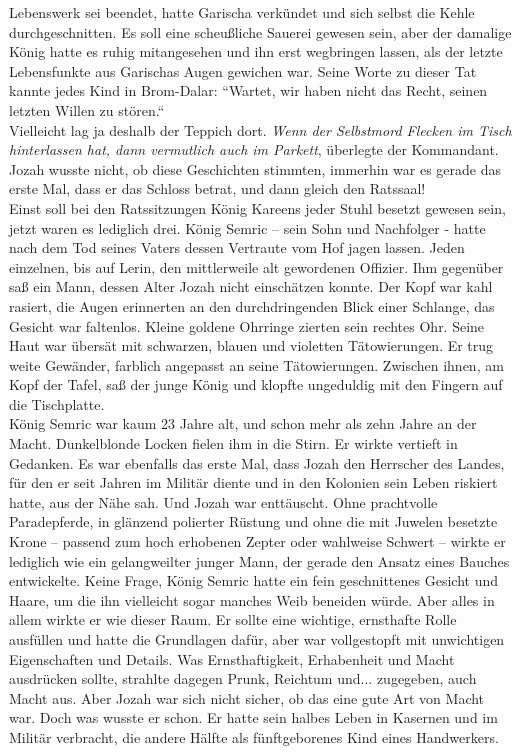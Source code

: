 Lebenswerk sei beendet, hatte Garischa verkündet und sich selbst die Kehle durchgeschnitten. Es soll 
eine scheußliche Sauerei gewesen sein, aber der damalige König hatte es ruhig mitangesehen und ihn 
erst wegbringen lassen, als der letzte Lebensfunkte aus Garischas Augen gewichen war. Seine Worte zu 
dieser Tat kannte jedes Kind in Brom-Dalar: ``Wartet, wir haben nicht das Recht, seinen letzten 
Willen zu stören.``\\ 
Vielleicht lag ja deshalb der Teppich dort. \textit{Wenn der Selbstmord Flecken im Tisch 
hinterlassen hat, dann vermutlich auch im Parkett}, überlegte der Kommandant.\\
Jozah wusste nicht, ob diese Geschichten stimmten, immerhin war es gerade das erste Mal, dass er das 
Schloss betrat, und dann gleich den Ratssaal!\\
Einst soll bei den Ratssitzungen König Kareens jeder Stuhl besetzt gewesen sein, jetzt waren es 
lediglich drei. König Semric – sein Sohn und Nachfolger - hatte nach dem Tod seines Vaters dessen 
Vertraute vom Hof jagen lassen. Jeden einzelnen, bis auf Lerin, den mittlerweile alt gewordenen 
Offizier. Ihm gegenüber saß ein Mann, dessen Alter Jozah nicht einschätzen konnte. Der Kopf war 
kahl rasiert, die Augen erinnerten an den durchdringenden Blick einer Schlange, das Gesicht war 
faltenlos. Kleine goldene Ohrringe zierten sein rechtes Ohr. Seine Haut war übersät mit schwarzen, 
blauen und violetten Tätowierungen. Er trug weite Gewänder, farblich angepasst an seine 
Tätowierungen. Zwischen ihnen, am Kopf der Tafel, saß der junge König und klopfte ungeduldig mit 
den Fingern auf die Tischplatte. \\
König Semric war kaum 23 Jahre alt, und schon mehr als zehn Jahre an der Macht. Dunkelblonde Locken 
fielen ihm in die Stirn. Er wirkte vertieft in Gedanken. Es war ebenfalls das erste Mal, dass Jozah 
den Herrscher des Landes, für den er seit Jahren im Militär diente und in den Kolonien sein Leben 
riskiert hatte, aus der Nähe sah. Und Jozah war enttäuscht. Ohne  prachtvolle Paradepferde, in 
glänzend polierter Rüstung und ohne die mit Juwelen besetzte Krone – passend zum hoch erhobenen 
Zepter oder wahlweise Schwert – wirkte er lediglich wie ein gelangweilter junger Mann, der gerade 
den Ansatz eines Bauches entwickelte. Keine Frage, König Semric hatte ein fein geschnittenes 
Gesicht und Haare, um die ihn vielleicht sogar manches Weib beneiden würde. Aber alles in allem 
wirkte er wie dieser Raum. Er sollte eine wichtige, ernsthafte Rolle ausfüllen und hatte die 
Grundlagen dafür, aber war vollgestopft mit unwichtigen Eigenschaften und Details. Was 
Ernsthaftigkeit, Erhabenheit und Macht ausdrücken sollte, strahlte dagegen Prunk, Reichtum und... 
zugegeben, auch Macht aus. Aber Jozah war sich nicht sicher, ob das eine gute Art von Macht war. 
Doch was wusste er schon. Er hatte sein halbes Leben in Kasernen und im Militär verbracht, die 
andere Hälfte als fünftgeborenes Kind eines Handwerkers.\\

